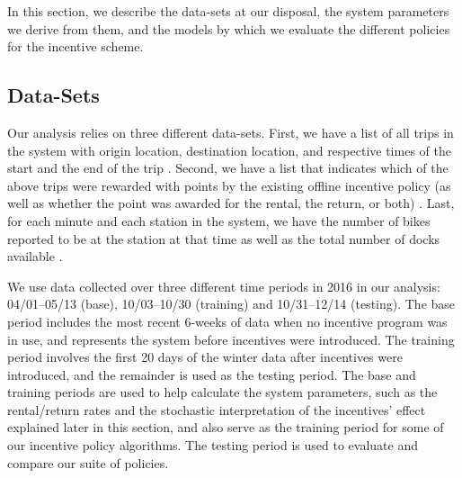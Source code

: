 In this section, we describe the data-sets at our disposal, the system parameters we derive from them, and the models by which we evaluate the different policies for the incentive scheme.

\subsection{Data-Sets}

Our analysis relies on three different data-sets. First, we have a list of all trips in the system with origin location, destination location, and respective times of the start and the end of the trip \cite{citibikedata}. Second, we have a list that indicates which of the above trips were rewarded with points by the existing offline incentive policy (as well as whether the point was awarded for the rental, the return, or both) \cite{citibikeInternal}. Last, for each minute and each station in the system, we have the number of bikes reported to be at the station at that time as well as the total number of docks available \cite{citibikejson}.

We use data collected over three different time periods in 2016 in our analysis: 04/01--05/13 (base), 10/03--10/30 (training) and 10/31--12/14 (testing). The base period includes the most recent 6-weeks of data when no incentive program was in use, and represents the system before incentives were introduced. The training period involves the first 20 days of the winter data after incentives were introduced, and the remainder is used as the testing period. The base and training periods are used to help calculate the system parameters, such as the rental/return rates and the stochastic interpretation of the incentives' effect explained later in this section, and also serve as the training period for some of our incentive policy algorithms. The testing period is used to evaluate and compare our suite of policies. 




